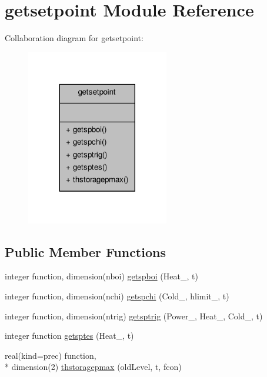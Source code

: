 \hypertarget{classgetsetpoint}{\section{getsetpoint Module Reference}
\label{classgetsetpoint}
}


Collaboration diagram for getsetpoint\-:
\nopagebreak
\begin{figure}[H]
\begin{center}
\leavevmode
\includegraphics[width=176pt]{classgetsetpoint__coll__graph}
\end{center}
\end{figure}
\subsection*{Public Member Functions}
\begin{DoxyCompactItemize}
\item 
integer function, dimension(nboi) \hyperlink{classgetsetpoint_a9906ea2ba345b2fd95981a7a897d5269}{getspboi} (Heat\-\_\-, t)
\item 
integer function, dimension(nchi) \hyperlink{classgetsetpoint_a4030a3269c952fe830bccaa59bad9cad}{getspchi} (Cold\-\_\-, hlimit\-\_\-, t)
\item 
integer function, dimension(ntrig) \hyperlink{classgetsetpoint_ac91c9058ddad4f3b52a502be6d1589ec}{getsptrig} (Power\-\_\-, Heat\-\_\-, Cold\-\_\-, t)
\item 
integer function \hyperlink{classgetsetpoint_ad6353e72adbd16ea6a5f870bb905c95f}{getsptes} (Heat\-\_\-, t)
\item 
real(kind=prec) function, \\*
dimension(2) \hyperlink{classgetsetpoint_a08d663082882daf5f3ad66670325b0c8}{thstoragepmax} (old\-Level, t, fcon)
\end{DoxyCompactItemize}


